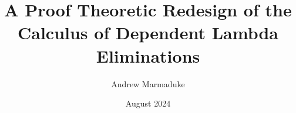 \documentclass[letterpaper, 11pt]{uiowa-thesis}
\title{A Proof Theoretic Redesign of the Calculus of Dependent Lambda Eliminations}
\author{Andrew Marmaduke}
\date{August 2024}
\begin{document}

\titlepage

\copyrightPage

\frontmatter








\tableofcontents

\setlength{\cftparskip}{\baselineskip}
\listoffigures

%

\mainmatter








%
%
%

\backmatter

\printbibliography
\end{document}
